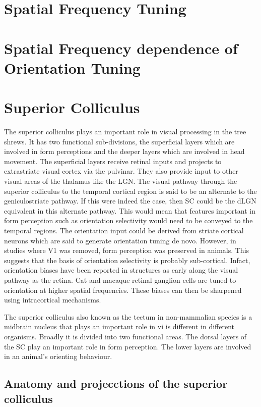 	\section{Spatial Frequency Tuning}
	
	\section{Spatial Frequency dependence of Orientation Tuning}
	\section{Superior Colliculus}
	
	The superior colliculus plays an important role in visual processing in the tree shrews. It has two functional sub-divisions, the superficial layers which are involved in form perceptions and the deeper layers which are involved in head movement. The superficial layers receive retinal inputs and projects to extrastriate visual cortex via the pulvinar. They also provide input to other visual areas of the thalamus like the LGN. The visual pathway through the superior colliculus to the temporal cortical region is said to be an alternate to the geniculostriate pathway. If this were indeed the case, then SC could be the dLGN equivalent in this alternate pathway. This would mean that features important in form perception such as orientation selectivity would need to be conveyed to the temporal regions. The orientation input could be derived from striate cortical neurons which are said to generate orientation tuning de novo. However, in studies where V1 was removed, form perception was preserved in animals. This suggests that the basis of orientation selectivity is probably sub-cortical. Infact, orientation biases have been reported in structures as early along the visual pathway as the retina. Cat and macaque retinal ganglion cells are tuned to orientation at higher spatial frequencies. These biases can then be sharpened using intracortical mechanisms.
	
	
	The superior colliculus also known as the tectum in non-mammalian species is a midbrain nucleus that plays an important role in vi is different in different organisms. Broadly it is divided into two functional areas. The dorsal layers of the SC play an important role in form perception. The lower layers are involved in an animal's orienting behaviour. 
	\subsection{Anatomy and projecctions of the superior colliculus}
